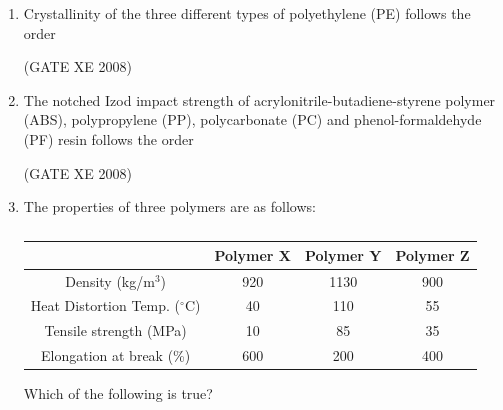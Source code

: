 \documentclass[12pt]{article}
\begin{document}
\begin{enumerate}
\item Crystallinity of the three different types of polyethylene (PE) follows the order

\begin{enumerate}
\end{enumerate}

(GATE XE 2008)

\item The notched Izod impact strength of acrylonitrile-butadiene-styrene polymer (ABS), polypropylene (PP), polycarbonate (PC) and phenol-formaldehyde (PF) resin follows the order

\begin{enumerate}
\end{enumerate}

(GATE XE 2008)

\item The properties of three polymers are as follows:

\begin{table}[H]     \centering     \caption{}     \label{}     \begin{tabular}{|c|c|c|c|}
\hline
 & \textbf{Polymer X} & \textbf{Polymer Y} & \textbf{Polymer Z} \\
\hline
Density (kg/m$^3$) & 920 & 1130 & 900 \\
Heat Distortion Temp. ($^\circ$C) & 40 & 110 & 55 \\
Tensile strength (MPa) & 10 & 85 & 35 \\
Elongation at break (\%) & 600 & 200 & 400 \\
\hline
\end{tabular} \end{table}

Which of the following is true? 


\end{enumerate}
\end{document}
